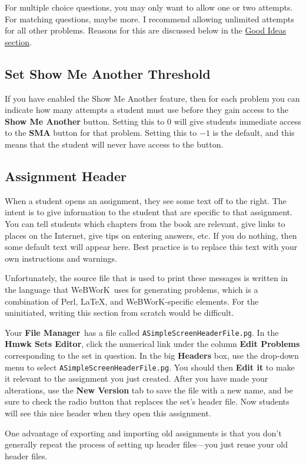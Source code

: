 \documentclass[12pt]{article}
\newcommand{\menu}[1]{\textbf{#1}}
\newcommand{\WW}{WeBWorK}
\newcommand{\HSE}{\menu{Hmwk Sets Editor}}
\newcommand{\FM}{\menu{File Manager}}
\begin{document}
For multiple choice questions, you may only want to allow one or two attempts.
For matching questions, maybe more.
I recommend allowing unlimited attempts for all other problems.
Reasons for this are discussed below in the \hyperref[goodideas]{Good Ideas section}.

\subsection{Set Show Me Another Threshold}
If you have enabled the Show Me Another feature, then for each problem you can indicate how many attempts a student must use before they gain access to the \menu{Show Me Another} button.
Setting this to $0$ will give students immediate access to the \menu{SMA} button for that problem.
Setting this to $-1$ is the default, and this means that the student will never have access to the button.

\subsection{Assignment Header}
When a student opens an assignment, they see some text off to the right.
The intent is to give information to the student that are specific to that assignment.
You can tell students which chapters from the book are relevant, give links to places on the Internet, give tips on entering answers, etc. If you do nothing, then some default text will appear here.
Best practice is to replace this text with your own instructions and warnings.

Unfortunately, the source file that is used to print these messages is written in the language that \WW\ uses for generating problems, which is a combination of Perl, \LaTeX, and \WW-specific elements.
For the uninitiated, writing this section from scratch would be difficult.

Your \FM\  has a file called \texttt{ASimpleScreenHeaderFile.pg}.
In the \HSE, click the numerical link under the column \menu{Edit Problems} corresponding to the set in question.
In the big \menu{Headers} box, use the drop-down menu to select \texttt{ASimpleScreenHeaderFile.pg}.
You should then \menu{Edit it} to make it relevant to the assignment you just created.
After you have made your alterations, use the \menu{New Version} tab to save the file with a new name, and be sure to check the radio button that replaces the set's header file.
Now students will see this nice header when they open this assignment.

One advantage of exporting and importing old assignments is that you don't generally repeat the process of setting up header files---you just reuse your old header files.
\end{document}
